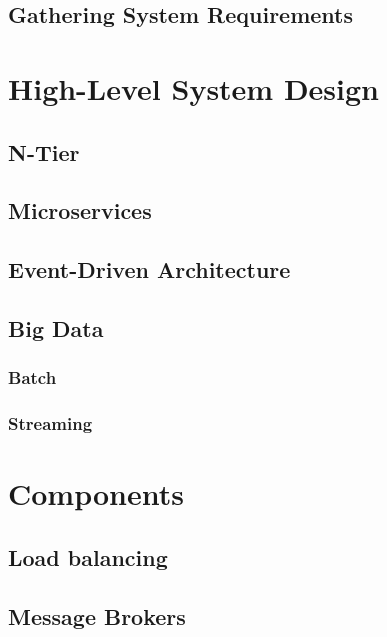 \documentclass[a4paper, 11pt]{book}
\begin{document}
    \subsection{Gathering System Requirements}
    \lipsum[1]

    \section{High-Level System Design}
    \lipsum[2]

    \subsection{N-Tier}

    \subsection{Microservices}

    \subsection{Event-Driven Architecture}

    \subsection{Big Data}

    \subsubsection{Batch}

    \subsubsection{Streaming}

    \section{Components}
    \lipsum[3]

    \subsection{Load balancing}

    \subsection{Message Brokers}
\end{document}
